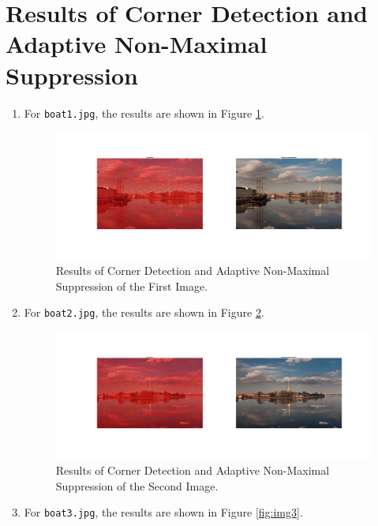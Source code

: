 \documentclass[english]{article}
\begin{document}
\section{Results of Corner Detection and Adaptive Non-Maximal Suppression}
\begin{enumerate}
    \item For \texttt{boat1.jpg}, the results are shown in Figure \ref{fig:img1}.\\
        \begin{figure}[H]
          \centering
          \includegraphics[width=1\textwidth]{img1.jpg}
          \caption{Results of Corner Detection and Adaptive Non-Maximal Suppression of the First Image.}
          \label{fig:img1}
        \end{figure}
        \item For \texttt{boat2.jpg}, the results are shown in Figure \ref{fig:img2}.\\
        \begin{figure}[H]
          \centering
          \includegraphics[width=1\textwidth]{img2.jpg}
          \caption{Results of Corner Detection and Adaptive Non-Maximal Suppression of the Second Image.}
          \label{fig:img2}
        \end{figure}
        \item For \texttt{boat3.jpg}, the results are shown in Figure \ref{fig:img3}.\\
        \begin{figure}[H]

\end{figure}
\end{enumerate}
\end{document}

